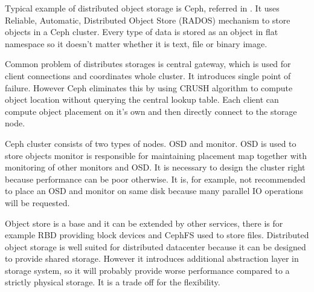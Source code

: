 Typical example of distributed object storage is Ceph, referred in \cite{ceph}. It uses Reliable, Automatic, Distributed Object Store (\Ac{RADOS}) mechanism to store objects in a Ceph cluster. Every type of data is stored as an object in flat namespace so it doesn't matter whether it is text, file or binary image. 

Common problem of distributes storages is central gateway, which is used for client connections and coordinates whole cluster. It introduces single point of failure. However Ceph eliminates this by using \Ac{CRUSH} algorithm to compute object location without querying the central lookup table. Each client can compute object placement on it's own and then directly connect to the storage node.

Ceph cluster consists of two types of nodes. \Ac{OSD} and monitor. \Ac{OSD} is used to store objects  monitor is responsible for maintaining placement map together with monitoring of other monitors and \Ac{OSD}. It is necessary to design the cluster right because performance can be poor otherwise. It is, for example, not recommended to place an \Ac{OSD} and monitor on same disk because many parallel \Ac{IO} operations will be requested.

Object store is a base and it can be extended by other services, there is for example \Ac{RBD} providing block devices and CephFS used to store files. Distributed object storage is well suited for distributed datacenter because it can be designed to provide shared storage. However it introduces additional abstraction layer in storage system, so it will probably provide worse performance compared to a strictly physical storage. It is a trade off for the flexibility.
